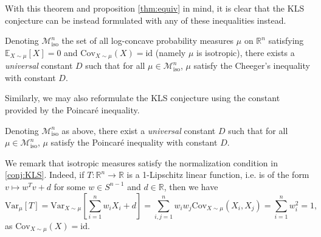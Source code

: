 With this theorem and proposition \ref{thm:equiv} in mind, it is clear that the KLS conjecture can be 
instead formulated with any of these inequalities instead. 

\begin{conjecture}
  Denoting \(\mathscr{M}^n_{\text{iso}}\) the set of all log-concave probability measures \(\mu\) on 
  \(\mathbb{R}^n\) satisfying \(\mathbb{E}_{X \sim \mu}[X] = 0\) and \(\text{Cov}_{X \sim \mu}(X) = \text{id}\) (namely \(\mu\) is isotropic), there exists
  a \textit{universal} constant \(D\) such that for all \(\mu \in \mathscr{M}^n_{\text{iso}}\), 
  \(\mu\) satisfy the Cheeger's inequality with constant \(D\).
\end{conjecture}

Similarly, we may also reformulate the KLS conjecture using the constant provided by the Poincaré inequality. 

\begin{conjecture}
  Denoting \(\mathscr{M}^n_{\text{iso}}\) as above, there exist a \textit{universal} constant \(D\) 
  such that for all \(\mu \in \mathscr{M}^n_{\text{iso}}\), \(\mu\) satisfy the Poincaré inequality 
  with constant \(D\).
\end{conjecture}

We remark that isotropic measures satisfy the normalization condition in \ref{conj:KLS}. Indeed, if 
\(T : \mathbb{R}^n \to \mathbb{R}\) is a 1-Lipschitz linear function, i.e. is of the form \(v \mapsto w^T v + d\) 
for some \(w \in S^{n - 1}\) and \(d \in \mathbb{R}\), then we have
\[\text{Var}_{\mu}[T] = \text{Var}_{X \sim \mu}\left[\sum_{i = 1}^n w_i X_i + d\right] 
    = \sum_{i, j = 1}^n w_i w_j \text{Cov}_{X \sim \mu}(X_i, X_j) = \sum_{i = 1}^n w_i^2 = 1,\]
as \(\text{Cov}_{X \sim \mu}(X) = \text{id}\).


